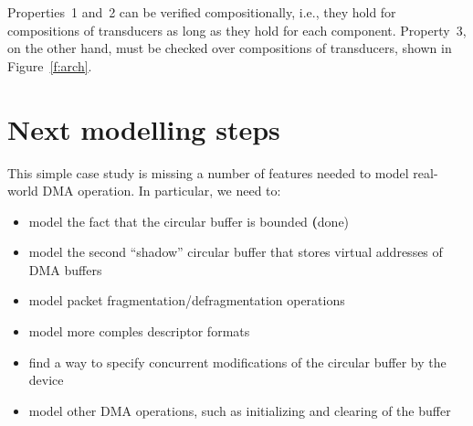 \documentclass{article}
\begin{document}
Properties~1 and~2 can be verified compositionally, i.e., they 
hold for compositions of transducers as long as they hold for each 
component.  Property~3, on the other hand, must be checked over 
compositions of transducers, shown in Figure~\ref{f:arch}.

\section{Next modelling steps}

This simple case study is missing a number of features needed to 
model real-world DMA operation.  In particular, we need to:

\begin{itemize}
    \item model the fact that the circular buffer is bounded 
        \textbf(done)
    \item model the second ``shadow'' circular buffer that stores 
        virtual addresses of DMA buffers
    \item model packet fragmentation/defragmentation operations
    \item model more comples descriptor formats
    \item find a way to specify concurrent modifications of the 
        circular buffer by the device
    \item model other DMA operations, such as initializing and 
        clearing of the buffer

\end{itemize}
\end{document}

